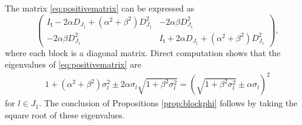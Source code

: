 \documentclass[reqno]{amsart}
\theoremstyle{plain}
\theoremstyle{definition}
\begin{document}
The matrix \eqref{eq:positivematrix} can be expressed as
$$
\begin{pmatrix}
I_{\mathsf t}-2\alpha D_{J_1} + (\alpha^2 +\beta^2) D_{J_1}^2 & -2\alpha \beta D_{J_1}^2\\
-2\alpha \beta D_{J_1}^2 & I_{\mathsf t}+2\alpha D_{J_1} + (\alpha^2 +\beta^2) D_{J_1}^2
\end{pmatrix},
$$
where each block is a diagonal matrix. Direct computation shows that the eigenvalues of \eqref{eq:positivematrix} are
\begin{align*}
1+(\alpha^2 +\beta^2)\sigma_l^2 \pm 2\alpha \sigma_l \sqrt{1+\beta^2 \sigma_l^2} = \left(\sqrt{1+\beta^2 \sigma_l^2} \pm \alpha \sigma_l \right)^2
\end{align*}
for $l \in J_1$. 
The conclusion of Propositions \ref{prop:blockphi} follows by taking the square root of these eigenvalues.



\end{document}
